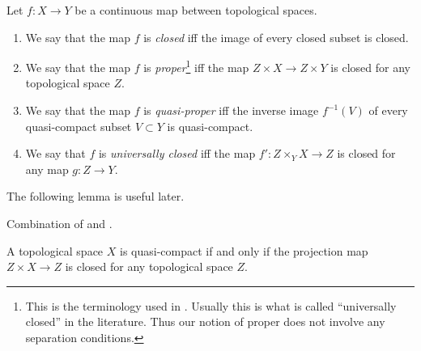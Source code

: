 \begin{definition}
\label{definition-proper-map}
Let $f : X\to Y$ be a continuous map between topological spaces.
\begin{enumerate}
\item We say that the map $f$ is {\it closed}
iff the image of every closed subset is closed.
\item We say that the map $f$ is {\it proper}\footnote{This is the
terminology used in \cite{Bourbaki}. Usually this is what
is called ``universally closed'' in the literature. Thus our notion
of proper does not involve any separation conditions.} iff
the map $Z \times X\to Z \times Y$ is closed for any topological space
$Z$.
\item We say that the map $f$ is {\it quasi-proper} iff
the inverse image $f^{-1}(V)$ of every quasi-compact subset $V \subset Y$
is quasi-compact.
\item We say that $f$ is {\it universally closed} iff
the map $f': Z \times_Y X \to Z$ is closed for any map $g: Z \to Y$.
\end{enumerate}
\end{definition}

\noindent
The following lemma is useful later.

\begin{lemma}
\label{lemma-characterize-quasi-compact}
\begin{reference}
Combination of
\cite[I, p. 75, Lemme 1]{Bourbaki} and
\cite[I, p. 76, Corrolaire 1]{Bourbaki}.
\end{reference}
A topological space $X$ is quasi-compact if and only if the
projection map $Z \times X \to Z$ is closed for
any topological space $Z$.
\end{lemma}

